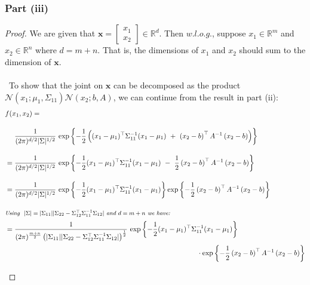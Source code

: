 \documentclass[twoside,11pt]{homework}
\DeclarePairedDelimiter{\2norm}{\lVert}{\rVert^2_2}
\newcommand{\1}[1]{\mathds{1}\left[#1\right]}
\begin{document}
\subsubsection*{Part (iii)} 
\begin{proof}
We are given that $\textbf{x} = \begin{bmatrix} x_1 \\ x_2 \end{bmatrix} \in \mathbb{R}^d$. Then $w.l.o.g.$, suppose $x_1 \in \mathbb{R}^m$ and $x_2 \in \mathbb{R}^n$ where $d = m + n$. That is, the dimensions of $x_1$ and $x_2$ should sum to the dimension of $\textbf{x}$. \\\ \\\
To show that the joint on $\textbf{x}$ can be decomposed as the product\ $\mathcal{N}\left(x_1; \mu_1, \Sigma_{11}\right)\mathcal{N}\left(x_2; b, A\right)$, we can continue from the result in part (ii):
\begin{align*} \hspace{-3cm}
& f(x_1, x_2) =  \\[1em]
& \ \ \ \ \frac{1}{(2\pi)^{d/2}|\Sigma|^{1/2}} \ \text{exp} \left\lbrace -\frac{1}{2}\left((x_1 - \mu_1)^{\top}\Sigma_{11}^{-1}(x_1-\mu_1) \ + \ \left(x_2 - b \right)^{\top} A^{-1} \left(x_2 - b \right)\right) \right\rbrace \\[1em]
& = \frac{1}{(2\pi)^{d/2}|\Sigma|^{1/2}} \ \text{exp} \left\lbrace -\frac{1}{2}(x_1 - \mu_1)^{\top}\Sigma_{11}^{-1}(x_1-\mu_1) \ - \ \frac{1}{2}\left(x_2 - b \right)^{\top} A^{-1} \left(x_2 - b \right) \right\rbrace \\[1em]
& = \frac{1}{(2\pi)^{d/2}|\Sigma|^{1/2}} \ \text{exp} \left\lbrace -\frac{1}{2}(x_1 - \mu_1)^{\top}\Sigma_{11}^{-1}(x_1-\mu_1) \right\rbrace \text{exp} \left\lbrace -\frac{1}{2}\left(x_2 - b \right)^{\top} A^{-1} \left(x_2 - b \right) \right\rbrace \\[1em]
\intertext{\footnotesize \textit{Using \ $|\Sigma| = |\Sigma_{11}||\Sigma_{22} - \Sigma_{12}^{\top}\Sigma_{11}^{-1}\Sigma_{12}|$ and $d = m+n$ we have:}}
& = \frac{1}{(2\pi)^{\frac{m+n}{2}}\left(|\Sigma_{11}||\Sigma_{22} - \Sigma_{12}^{\top}\Sigma_{11}^{-1}\Sigma_{12}|\right)^{\frac{1}{2}}} \ \text{exp} \left\lbrace -\frac{1}{2}(x_1 - \mu_1)^{\top}\Sigma_{11}^{-1}(x_1-\mu_1) \right\rbrace \\[0.1em]
&\quad \ \ \ \ \ \ \ \ \ \ \ \ \ \ \ \ \ \ \ \ \ \ \ \ \ \ \ \ \ \ \ \ \ \ \ \ \ \ \ \ \ \ \ \ \ \ \ \ \ \ \ \ \ \ \ \ \ \ \ \ \ \ \ \ \ \ \ \ \ \ \ \ \ \ \ \ \ \ \ \cdot \text{exp} \left\lbrace -\frac{1}{2}\left(x_2 - b \right)^{\top} A^{-1} \left(x_2 - b \right) \right\rbrace \\[0.5em]

\end{align*}
\end{proof}
\end{document}
